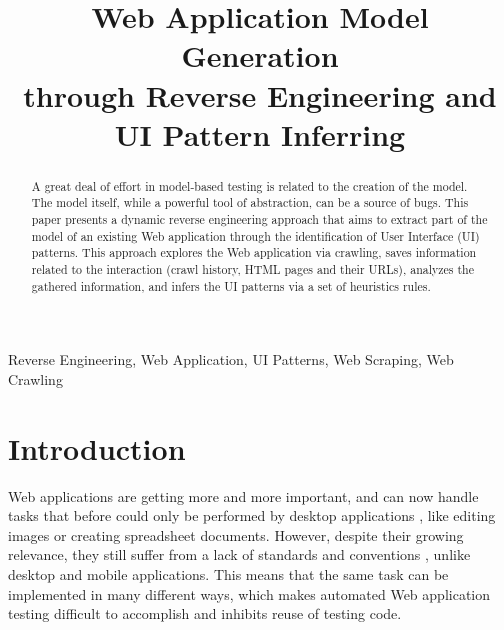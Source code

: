 \documentclass[conference]{IEEEtran}
\begin{document}
%
\title{Web Application Model Generation \\through Reverse Engineering and UI Pattern Inferring}

\author{
}


\maketitle

\begin{abstract}
A great deal of effort in model-based testing is related to the creation of the model. The model itself, while a powerful tool of abstraction, can be a source of bugs. This paper presents a dynamic reverse engineering approach that aims to extract part of the model of an existing Web application through the identification of User Interface (UI) patterns. This approach explores the Web application via crawling, saves information related to the interaction (crawl history, HTML pages and their URLs), analyzes the gathered information, and infers the UI patterns via a set of heuristics rules.
\end{abstract}
\begin{IEEEkeywords} Reverse Engineering, Web Application, UI Patterns, Web Scraping, Web Crawling \end{IEEEkeywords}

\IEEEpeerreviewmaketitle

\section{Introduction}\label{sec:intro}

Web applications are getting more and more important, and can now handle tasks that before could only be performed by desktop applications \cite{garrett2005ajax}, like editing images or creating spreadsheet documents. However, despite their growing relevance, they still suffer from a lack of standards and conventions \cite{constantine2002usage}, unlike desktop and mobile applications. This means that the same task can be implemented in many different ways, which makes automated Web application testing difficult to accomplish and inhibits reuse of testing code. 
\end{document}

